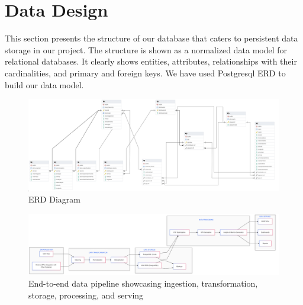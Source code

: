 \section{Data Design}

This section presents the structure of our database that caters to persistent data storage in our project. The structure is shown as a normalized data model for relational databases. It clearly shows entities, attributes, relationships with their cardinalities, and primary and foreign keys. We have used Postgresql ERD to build our data model.

\begin{figure}[H]
    \centering
\includegraphics[width=\textwidth]{images/erd.png} %
    \caption{ERD Diagram}
    \label{fig:UML-image}
\end{figure}
\begin{figure}[H]
    \centering
\includegraphics[width=1.1\textwidth]{images/DataPipeline (1).png} %
    \caption{End-to-end data pipeline showcasing ingestion, transformation, storage, processing, and serving}
    \label{fig:UML-image}
\end{figure}

 


